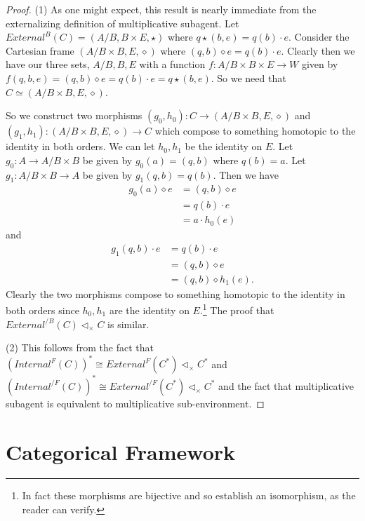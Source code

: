 \documentclass{article}
\begin{document}
\begin{proof}
(1) As one might expect, this result is nearly immediate from the externalizing definition of multiplicative subagent.
Let $External^B (C) = (A/B, B \times E, \star)$ where $q \star (b, e) = q(b) \cdot e$.
Consider the Cartesian frame $(A/B \times B, E, \diamond)$ where $(q, b) \diamond e = q(b) \cdot e$.
Clearly then we have our three sets, $A/B, B, E$ with a function $f : A/B \times B \times E \to W$ given by $f(q, b, e) = (q, b) \diamond e = q(b) \cdot e = q \star (b, e)$.
So we need that $C \simeq (A/B \times B, E, \diamond)$.

So we construct two morphisms $(g_0, h_0) : C \to (A/B \times B, E, \diamond)$ and $(g_1, h_1): (A/B \times B, E, \diamond) \to C$ which compose to something homotopic to the identity in both orders.
We can let $h_0, h_1$ be the identity on $E$.
Let $g_0 : A \to A/B \times B$ be given by $g_0(a) = (q, b)$ where $q(b) = a$.
Let $g_1: A/B \times B \to A$ be given by $g_1(q, b) = q(b)$.
Then we have
\[
\begin{split}
    g_0(a) \diamond e & = (q, b) \diamond e \\
                      & = q(b) \cdot e \\
                      & = a \cdot h_0(e)
\end{split}
\]
and
\[
\begin{split}
    g_1(q, b) \cdot e & = q(b) \cdot e \\
                      & = (q, b) \diamond e \\
                      & = (q, b) \diamond h_1(e).
\end{split}
\]
Clearly the two morphisms compose to something homotopic to the identity in both orders since $h_0, h_1$ are the identity on $E$.\footnote{In fact these morphisms are bijective and so establish an isomorphism, as the reader can verify.}
The proof that $External^{/B}(C) \triangleleft_{\times} C$ is similar.

\bigskip
(2) This follows from the fact that $(Internal^F(C))^* \cong External^F(C^*) \triangleleft_{\times} C^*$ and $(Internal^{/F}(C))^* \cong External^{/F}(C^*) \triangleleft_{\times} C^*$ and the fact that multiplicative subagent is equivalent to multiplicative sub-environment.
\end{proof}

\section{Categorical Framework}
\end{document}
